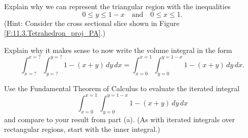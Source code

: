 \begin{pa}
Explain why we can represent the triangular region with the inequalities
        \[0 \leq y \leq 1-x \ \ \ \text{ and } \ \ \ 0 \leq x \leq 1.\]
        (Hint: Consider the cross sectional slice shown in Figure \ref{F:11.3.Tetrahedron_proj_PA}.)


\item Explain why it makes sense to now write
the volume integral in the form
        \[\int_{x=?}^{x=?} \int_{y=?}^{y=?} 1-(x+y) \, dy \, dx = \int_{x=0}^{x=1} \int_{y=0}^{y=1-x} 1-(x+y) \, dy \, dx. \]

\item Use the Fundamental Theorem of Calculus to evaluate the iterated integral
        \[\int_{x=0}^{x=1} \int_{y=0}^{y=1-x} 1-(x+y) \, dy \, dx\]
        and compare to your result from part (a).  (As with iterated integrals over rectangular regions, start with the inner integral.)

    \ea

\end{pa} 


